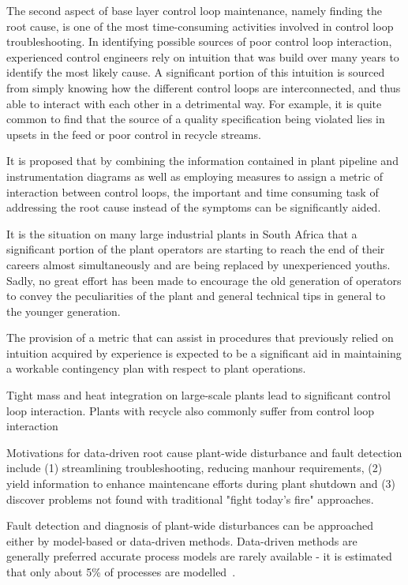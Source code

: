 \documentclass[a4paper]{book}
\begin{document}
The second aspect of base layer control loop maintenance, namely finding the root cause, is one of the most time-consuming activities involved in control loop troubleshooting.
In identifying possible sources of poor control loop interaction, experienced control engineers rely on intuition that was build over many years to identify the most likely cause.
A significant portion of this intuition is sourced from simply knowing how the different control loops are interconnected, and thus able to interact with each other in a detrimental way.
For example, it is quite common to find that the source of a quality specification being violated lies in upsets in the feed or poor control in recycle streams.

It is proposed that by combining the information contained in plant pipeline and instrumentation diagrams as well as employing measures to assign a metric of interaction between control loops, the important and time consuming task of addressing the root cause instead of the symptoms can be significantly aided.

It is the situation on many large industrial plants in South Africa that a significant portion of the plant operators are starting to reach the end of their careers almost simultaneously and are being replaced by unexperienced youths. Sadly, no great effort has been made to encourage the old generation of operators to convey the peculiarities of the plant and general technical tips in general to the younger generation.

The provision of a metric that can assist in procedures that previously relied on intuition acquired by experience is expected to be a significant aid in maintaining a workable contingency plan with respect to plant operations.


Tight mass and heat integration on large-scale plants lead to significant control loop interaction.
Plants with recycle also commonly suffer from control loop interaction~\cite{Bauer2005a}

Motivations for data-driven root cause plant-wide disturbance and fault detection include (1) streamlining troubleshooting, reducing manhour requirements, (2) yield information to enhance maintencane efforts during plant shutdown and (3) discover problems not found with traditional "fight today's fire" approaches.~\cite{Bauer2005a}

Fault detection and diagnosis of plant-wide disturbances can be approached either by model-based or data-driven methods.
Data-driven methods are generally preferred accurate process models are rarely available - it is estimated that only about 5\% of processes are modelled~\cite{Bauer2005a}. %
\end{document}
